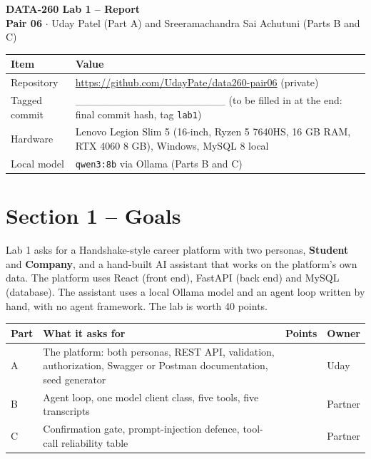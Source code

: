 \documentclass[11pt,letterpaper]{article}
\newcommand{\code}[1]{\texttt{#1}}
\begin{document}
\begin{center}
{\LARGE\bfseries DATA-260 Lab 1 -- Report}\\[6pt]
{\large \textbf{Pair 06} $\cdot$ Uday Patel (Part A) and Sreeramachandra Sai Achutuni (Parts B and C)}
\end{center}


{\small
\begin{longtable}{>{\raggedright\arraybackslash}p{}>{\raggedright\arraybackslash}p{}}
\hline
\textbf{Item} & \textbf{Value} \\ \hline
\endhead
Repository & \url{https://github.com/UdayPate/data260-pair06} (private) \\ \hline
Tagged commit & \_\_\_\_\_\_\_\_\_\_\_\_\_\_\_\_\_\_\_\_ (to be filled in at the end: final commit hash, tag \code{lab1}) \\ \hline
Hardware & Lenovo Legion Slim 5 (16-inch, Ryzen 5 7640HS, 16 GB RAM, RTX 4060 8 GB), Windows, MySQL 8 local \\ \hline
Local model & \code{qwen3:\allowbreak{}8b} via Ollama (Parts B and C) \\ \hline
\end{longtable}
}

\section*{Section 1 -- Goals}

Lab 1 asks for a Handshake-style career platform with two personas, \textbf{Student} and \textbf{Company}, and a hand-built AI assistant that works on the platform's own data. The platform uses React (front end), FastAPI (back end) and MySQL (database). The assistant uses a local Ollama model and an agent loop written by hand, with no agent framework. The lab is worth 40 points.

{\small
\begin{longtable}{>{\raggedright\arraybackslash}p{}>{\raggedright\arraybackslash}p{}>{\raggedleft\arraybackslash}p{}>{\raggedright\arraybackslash}p{}}
\hline
\textbf{Part} & \textbf{What it asks for} & \textbf{Points} & \textbf{Owner} \\ \hline
\endhead
A & The platform: both personas, REST API, validation, authorization, Swagger or Postman documentation, seed generator & 22 & Uday \\ \hline
B & Agent loop, one model client class, five tools, five transcripts & 12 & Partner \\ \hline
C & Confirmation gate, prompt-injection defence, tool-call reliability table & 6 & Partner \\ \hline
\end{longtable}
}
\end{document}
